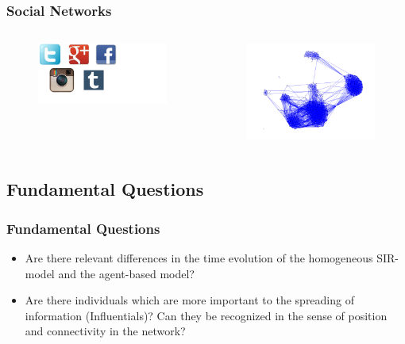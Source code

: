\documentclass{beamer}
\begin{document}
\begin{frame}
\frametitle{Social Networks}
\begin{columns}[c]

\begin{figure}
\includegraphics[width=6cm]{social-netw}
\end{figure}

\begin{figure}
\includegraphics[width=6cm]{Network-Graph}
\end{figure}
\end{columns}



\end{frame}















\subsection{Fundamental Questions}

\begin{frame}
\frametitle{Fundamental Questions}
\begin{itemize}

\item Are there relevant differences in the time evolution of the homogeneous SIR-model and the agent-based model?
\vspace{1cm}
\item Are there individuals which are more important to the spreading of information (Influentials)? Can they be recognized in the sense of position and connectivity in the network?


\end{itemize}
\end{frame}
\end{document}
